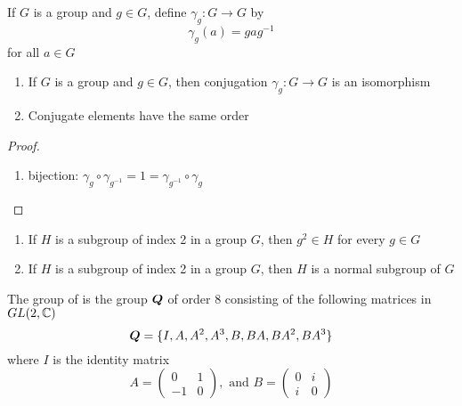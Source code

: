 \documentclass[11pt]{article}
\begin{document}
\begin{definition}[]
If \(G\) is a group and \(g\in G\), define  \(\gamma_g:G\to G\) by
\begin{equation*}
\gamma_g(a)=gag^{-1}
\end{equation*}
for all \(a\in G\)
\end{definition}

\begin{proposition}[]
\begin{enumerate}
\item If \(G\) is a group and \(g\in G\), then conjugation \(\gamma_g:G\to G\) is an
isomorphism
\item Conjugate elements have the same order
\end{enumerate}
\end{proposition}

\begin{proof}
\begin{enumerate}
\item bijection: \(\gamma_g\circ\gamma_{g^{-1}}=1=\gamma_{g^{-1}}\circ\gamma_g\)
\end{enumerate}
\end{proof}

\begin{proposition}[]
\begin{enumerate}
\item If \(H\) is a subgroup of index 2 in a group \(G\), then \(g^2\in H\) for every
\(g\in G\)
\item If \(H\) is a subgroup of index 2 in a group \(G\), then \(H\) is a normal
subgroup of \(G\)
\end{enumerate}
\end{proposition}

\begin{definition}[]
The group of  is the group \(\boldsymbol{Q}\) of order 8 consisting of the
following matrices in \(GL(2, \mathbb{C})\)
\begin{equation*}
\boldsymbol{Q}=\{I,A,A^2,A^3,B,BA,BA^2,BA^3\}
\end{equation*}
where \(I\) is the identity matrix
\begin{equation*}
A=
\begin{pmatrix}
0&1\\
-1&0
\end{pmatrix}, \text{ and }
B=\begin{pmatrix}
0&i\\
i&0
  \end{pmatrix}
\end{equation*}
\end{definition}
\end{document}
